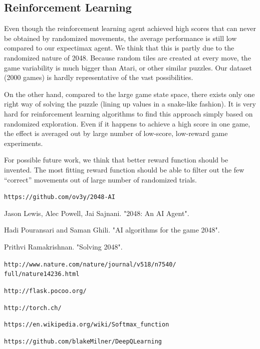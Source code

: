 \documentclass[9pt,twocolumn]{article}
\begin{document}
\subsection{Reinforcement Learning}

Even though the reinforcement learning agent achieved high scores that can never be obtained by randomized movements, the average performance is still low compared to our expectimax agent. We think that this is partly due to the randomized nature of 2048. Because random tiles are created at every move, the game variability is much bigger than Atari, or other similar puzzles. Our dataset (2000 games) is hardly representative of the vast possibilities.

On the other hand, compared to the large game state space, there exists only one right way of solving the puzzle (lining up values in a snake-like fashion). It is very hard for reinforcement learning algorithms to find this approach simply based on randomized exploration. Even if it happens to achieve a high score in one game, the effect is averaged out by large number of low-score, low-reward game experiments.

For possible future work, we think that better reward function should be invented. The most fitting reward function should be able to filter out the few “correct” movements out of large number of randomized trials.

\begin{thebibliography}{9}

 \texttt{https://github.com/ov3y/2048-AI}

 Jason Lewis, Alec Powell, Jai Sajnani. "2048: An AI Agent".

 Hadi Pouransari and Saman Ghili. "AI algorithms for the game 2048".

 Prithvi Ramakrishnan. "Solving 2048".

 \texttt{http://www.nature.com/nature/journal/v518/n7540/\\full/nature14236.html}

 \texttt{http://flask.pocoo.org/}

 \texttt{http://torch.ch/}

 \texttt{https://en.wikipedia.org/wiki/Softmax\_function}

 \texttt{https://github.com/blakeMilner/DeepQLearning}


\end{thebibliography}
\end{document}
